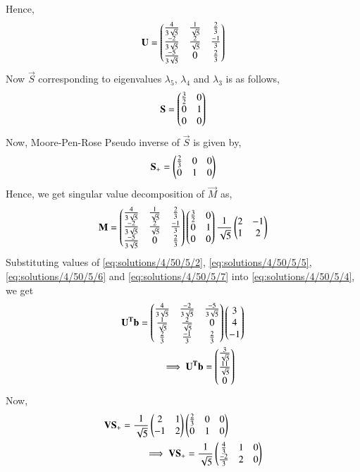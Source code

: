 Hence,
\begin{align}
	\mathbf{U} = \begin{pmatrix}\frac{4}{3\sqrt{5}} & \frac{1}{\sqrt{5}} & \frac{2}{3} \\ \frac{-2}{3\sqrt{5}}  & \frac{2}{\sqrt{5}} & \frac{-1}{3} \\ \frac{-5}{3\sqrt{5}}  & 0 & \frac{2}{3} \end{pmatrix} \label{eq:solutions/4/50/5/6}
\end{align}
Now $\vec{S}$ corresponding to eigenvalues $\lambda_5$, $\lambda_4$ and $\lambda_3$ is as follows,
\begin{align}
	\mathbf{S} = \begin{pmatrix}\frac{3}{2} & 0 \\ 0 & 1  \\ 0 & 0\end{pmatrix}\label{eq:solutions/4/50/5/7}
\end{align}
Now, Moore-Pen-Rose Pseudo inverse of $\vec{S}$ is given by,
\begin{align}
	\mathbf{S_+} = \begin{pmatrix}\frac{2}{3} & 0 & 0 \\ 0 & 1 & 0\end{pmatrix}
\end{align}
Hence, we get singular value decomposition of $\vec{M}$ as,
\begin{align}
\mathbf{M} = \begin{pmatrix}\frac{4}{3\sqrt{5}} & \frac{1}{\sqrt{5}} & \frac{2}{3} \\ \frac{-2}{3\sqrt{5}}  & \frac{2}{\sqrt{5}} & \frac{-1}{3} \\ \frac{-5}{3\sqrt{5}}  & 0 & \frac{2}{3} \end{pmatrix} \begin{pmatrix}\frac{3}{2} & 0 \\ 0 & 1  \\ 0 & 0\end{pmatrix} \frac{1}{\sqrt{5}}\begin{pmatrix}2 & -1 \\ 1 & 2 \end{pmatrix}
\end{align}
Substituting values of \eqref{eq:solutions/4/50/5/2}, \eqref{eq:solutions/4/50/5/5}, \eqref{eq:solutions/4/50/5/6} and \eqref{eq:solutions/4/50/5/7} into \eqref{eq:solutions/4/50/5/4}, we get
\begin{align}
& \mathbf{U^Tb} =  \begin{pmatrix}\frac{4}{3\sqrt{5}} & \frac{-2}{3\sqrt{5}} & \frac{-5}{3\sqrt{5}} \\ \frac{1}{\sqrt{5}}   & \frac{2}{\sqrt{5}} & 0 \\ \frac{2}{3} & \frac{-1}{3} & \frac{2}{3}\end{pmatrix}
\begin{pmatrix}3 \\4\\-1\end{pmatrix} \\
& \qquad \qquad\implies \mathbf{U^Tb} = \begin{pmatrix}\frac{3}{\sqrt{5}} \\ \frac{11}{\sqrt{5}} \\ 0\end{pmatrix} 
\end{align}
Now,
\begin{align}
& \mathbf{VS_+} = \frac{1}{\sqrt{5}}\begin{pmatrix}2 & 1 \\ -1 & 2 \end{pmatrix}\begin{pmatrix}\frac{2}{3} & 0 & 0 \\ 0 & 1 & 0\end{pmatrix}\\
& \qquad \qquad \implies \mathbf{VS_+} = \frac{1}{\sqrt{5}}\begin{pmatrix}\frac{4}{3} & 1 &0 \\ \frac{-2}{3} & 2 & 0 \end{pmatrix}
\end{align}
